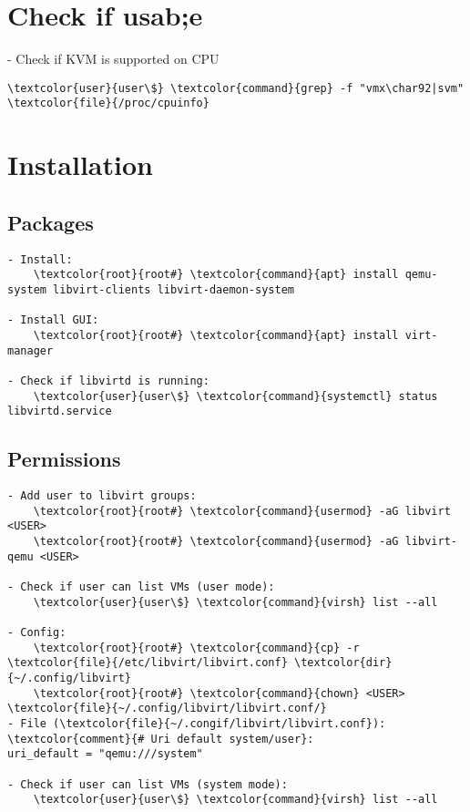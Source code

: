 \documentclass[10pt, a4paper, onecolumn, openany]{book} %
\begin{document}
\section{Check if usab;e}
- Check if KVM is supported on CPU
\begin{Verbatim}[commandchars=\\\{\}]
    \textcolor{user}{user\$} \textcolor{command}{grep} -f "vmx\char92|svm" \textcolor{file}{/proc/cpuinfo}
\end{Verbatim}

\section{Installation}
\subsection{Packages}
\begin{Verbatim}[commandchars=\\\{\}]
- Install:
    \textcolor{root}{root#} \textcolor{command}{apt} install qemu-system libvirt-clients libvirt-daemon-system

- Install GUI:
    \textcolor{root}{root#} \textcolor{command}{apt} install virt-manager

- Check if libvirtd is running:
    \textcolor{user}{user\$} \textcolor{command}{systemctl} status libvirtd.service
\end{Verbatim}

\subsection{Permissions}
\begin{Verbatim}[commandchars=\\\{\}]
- Add user to libvirt groups:
    \textcolor{root}{root#} \textcolor{command}{usermod} -aG libvirt <USER>
    \textcolor{root}{root#} \textcolor{command}{usermod} -aG libvirt-qemu <USER>

- Check if user can list VMs (user mode):
    \textcolor{user}{user\$} \textcolor{command}{virsh} list --all

- Config:
    \textcolor{root}{root#} \textcolor{command}{cp} -r \textcolor{file}{/etc/libvirt/libvirt.conf} \textcolor{dir}{~/.config/libvirt}
    \textcolor{root}{root#} \textcolor{command}{chown} <USER> \textcolor{file}{~/.config/libvirt/libvirt.conf/}
- File (\textcolor{file}{~/.congif/libvirt/libvirt.conf}):
\textcolor{comment}{# Uri default system/user}:
uri_default = "qemu:///system"

- Check if user can list VMs (system mode):
    \textcolor{user}{user\$} \textcolor{command}{virsh} list --all
\end{Verbatim}
\end{document}
